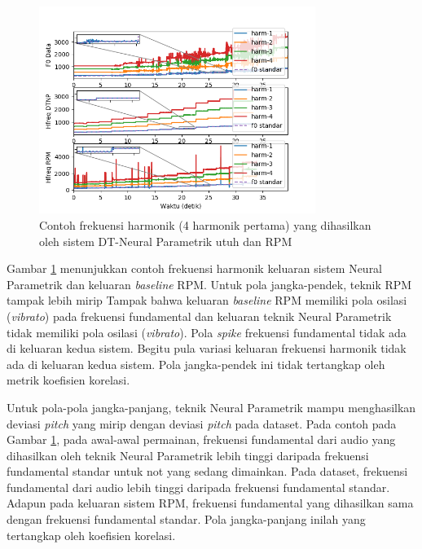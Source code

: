 \begin{figure}[htbp]
    \centering
    \includegraphics[width=0.8\textwidth]{resources/Analisis_wholesystem_Hfreq.png}
    \caption{Contoh frekuensi harmonik (4 harmonik pertama) yang dihasilkan oleh sistem DT-Neural Parametrik utuh dan RPM}\label{fig-wholesystem-hfreq-output-sample}
\end{figure}

Gambar \ref{fig-wholesystem-hfreq-output-sample} menunjukkan contoh frekuensi harmonik keluaran sistem Neural Parametrik dan keluaran \textit{baseline} RPM. Untuk pola jangka-pendek, teknik RPM tampak lebih mirip Tampak bahwa keluaran \textit{baseline} RPM memiliki pola osilasi (\textit{vibrato}) pada frekuensi fundamental dan keluaran teknik Neural Parametrik tidak memiliki pola osilasi (\textit{vibrato}). Pola \textit{spike} frekuensi fundamental tidak ada di keluaran kedua sistem. Begitu pula variasi keluaran frekuensi harmonik tidak ada di keluaran kedua sistem. Pola jangka-pendek ini tidak tertangkap oleh metrik koefisien korelasi.

Untuk pola-pola jangka-panjang, teknik Neural Parametrik mampu menghasilkan deviasi \textit{pitch} yang mirip dengan deviasi \textit{pitch} pada dataset. Pada contoh pada Gambar \ref{fig-wholesystem-hfreq-output-sample}, pada awal-awal permainan, frekuensi fundamental dari audio yang dihasilkan oleh teknik Neural Parametrik lebih tinggi daripada frekuensi fundamental standar untuk not yang sedang dimainkan. Pada dataset, frekuensi fundamental dari audio lebih tinggi daripada frekuensi fundamental standar. Adapun pada keluaran sistem RPM, frekuensi fundamental yang dihasilkan sama dengan frekuensi fundamental standar. Pola jangka-panjang inilah yang tertangkap oleh koefisien korelasi.

